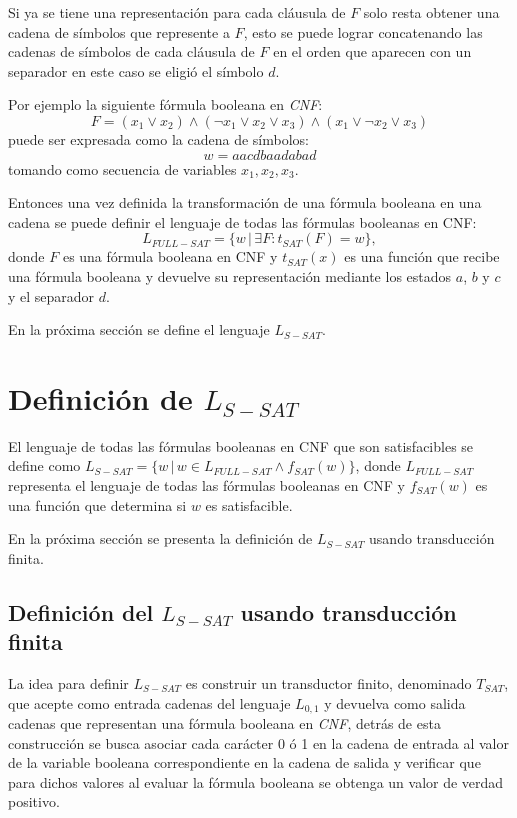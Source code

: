 \documentclass[12pt]{article}
\begin{document}
Si ya se tiene una representación para cada cláusula de $F$ solo resta obtener una cadena de símbolos que represente a $F$,
esto se puede lograr concatenando las cadenas de símbolos de cada cláusula de $F$ en el orden que aparecen con un separador
en este caso se eligió el símbolo $d$.

Por ejemplo la siguiente fórmula booleana en \textit{CNF}:
$$F=(x_1 \vee x_2) \wedge (\neg x_1 \vee x_2 \vee x_3) \wedge (x_1 \vee \neg x_2 \vee x_3)$$
puede ser expresada como la cadena de símbolos:
$$w=aacdbaadabad$$
tomando como secuencia de variables $x_1, x_2, x_3$.

Entonces una vez definida la transformación de una fórmula booleana en una cadena se puede definir el lenguaje
de todas las fórmulas booleanas en CNF:
$$L_{FULL-SAT}=\{w\,|\,\exists F : t_{SAT}(F)=w\},$$
donde $F$ es una fórmula booleana en CNF y $t_{SAT}(x)$ es una función que recibe una fórmula booleana y devuelve
su representación mediante los estados $a$, $b$ y $c$ y el separador $d$.

En la próxima sección se define el lenguaje $L_{S-SAT}$.

\section{Definición de $L_{S-SAT}$}

El lenguaje de todas las fórmulas booleanas en CNF que son satisfacibles se define como $L_{S-SAT}=\{w\,|\,w \in L_{FULL-SAT} \wedge f_{SAT}(w)\}$, 
donde $L_{FULL-SAT}$ representa el lenguaje de todas las fórmulas booleanas en CNF y $f_{SAT}(w)$
es una función que determina si $w$ es satisfacible.

En la próxima sección se presenta la definición de $L_{S-SAT}$ usando transducción finita.

\subsection{Definición del $L_{S-SAT}$ usando transducción finita}

La idea para definir $L_{S-SAT}$ es construir un transductor finito, denominado $T_{SAT}$, que acepte como entrada cadenas del lenguaje $L_{0,1}$
y devuelva como salida cadenas que representan una fórmula booleana en \textit{CNF}, detrás de esta construcción se busca asociar cada carácter 0 ó 1 en la cadena de entrada al valor de la variable booleana correspondiente en la cadena de salida y verificar que para dichos valores al evaluar la fórmula booleana se obtenga un valor de verdad positivo.
\end{document}
